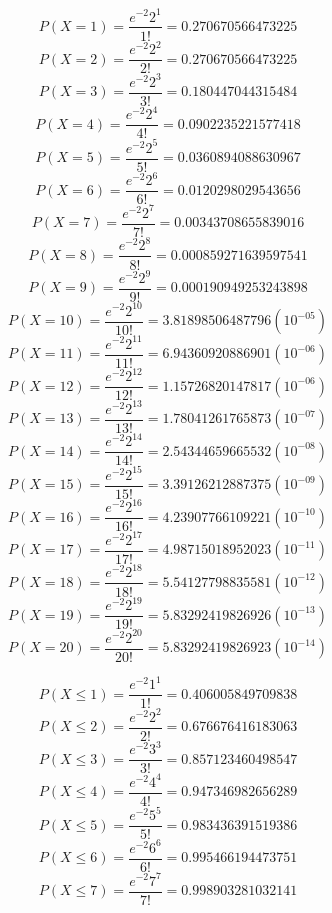 $$P(X=1)=\frac{e^{-2}2^{1}}{1!}=0.270670566473225$$
$$P(X=2)=\frac{e^{-2}2^{2}}{2!}=0.270670566473225$$
$$P(X=3)=\frac{e^{-2}2^{3}}{3!}=0.180447044315484$$
$$P(X=4)=\frac{e^{-2}2^{4}}{4!}=0.0902235221577418$$
$$P(X=5)=\frac{e^{-2}2^{5}}{5!}=0.0360894088630967$$
$$P(X=6)=\frac{e^{-2}2^{6}}{6!}=0.0120298029543656$$
$$P(X=7)=\frac{e^{-2}2^{7}}{7!}=0.00343708655839016$$
$$P(X=8)=\frac{e^{-2}2^{8}}{8!}=0.000859271639597541$$
$$P(X=9)=\frac{e^{-2}2^{9}}{9!}=0.000190949253243898$$
$$P(X=10)=\frac{e^{-2}2^{10}}{10!}=3.81898506487796(10^{-05})$$
$$P(X=11)=\frac{e^{-2}2^{11}}{11!}=6.94360920886901(10^{-06})$$
$$P(X=12)=\frac{e^{-2}2^{12}}{12!}=1.15726820147817(10^{-06})$$
$$P(X=13)=\frac{e^{-2}2^{13}}{13!}=1.78041261765873(10^{-07})$$
$$P(X=14)=\frac{e^{-2}2^{14}}{14!}=2.54344659665532(10^{-08})$$
$$P(X=15)=\frac{e^{-2}2^{15}}{15!}=3.39126212887375(10^{-09})$$
$$P(X=16)=\frac{e^{-2}2^{16}}{16!}=4.23907766109221(10^{-10})$$
$$P(X=17)=\frac{e^{-2}2^{17}}{17!}=4.98715018952023(10^{-11})$$
$$P(X=18)=\frac{e^{-2}2^{18}}{18!}=5.54127798835581(10^{-12})$$
$$P(X=19)=\frac{e^{-2}2^{19}}{19!}=5.83292419826926(10^{-13})$$
$$P(X=20)=\frac{e^{-2}2^{20}}{20!}=5.83292419826923(10^{-14})$$

$$P(X\leqslant1)=\frac{e^{-2}1^{1}}{1!}=0.406005849709838$$
$$P(X\leqslant2)=\frac{e^{-2}2^{2}}{2!}=0.676676416183063$$
$$P(X\leqslant3)=\frac{e^{-2}3^{3}}{3!}=0.857123460498547$$
$$P(X\leqslant4)=\frac{e^{-2}4^{4}}{4!}=0.947346982656289$$
$$P(X\leqslant5)=\frac{e^{-2}5^{5}}{5!}=0.983436391519386$$
$$P(X\leqslant6)=\frac{e^{-2}6^{6}}{6!}=0.995466194473751$$
$$P(X\leqslant7)=\frac{e^{-2}7^{7}}{7!}=0.998903281032141$$
